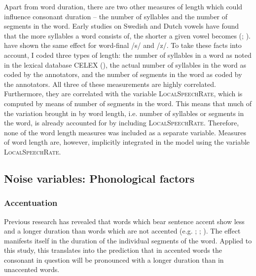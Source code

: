 Apart from word duration, there are two other measures of length which could influence consonant duration --  the number of syllables and the number of segments in the word.  Early studies on Swedish and Dutch vowels have found that the more syllables a word consists of, the shorter a given vowel becomes (\citealt{Lindblom.1963}; \citealt{Nooteboom.1972}). \citet{Plag.2017} have shown the same effect for word-final  /s/ and /z/. To take these facts into account, I coded three types of  length: the number of syllables in a word as noted in the lexical database CELEX (\citealt{Baayen.1995}), the actual number of syllables in the word as coded by the annotators, and the number of segments in the word as coded by the annotators. All three of these measurements are highly correlated. Furthermore, they are correlated with the variable \textsc{LocalSpeechRate}, which is computed by means of number of segments in the word. This means that much of the variation brought in by word length, i.e. number of syllables or segments in the word, is already accounted for by including \textsc{LocalSpeechRate}. Therefore, none of the word length measures was included as a separate variable. Measures of word length are, however, implicitly integrated in the model using the variable \textsc{LocalSpeechRate}.

\subsection{Noise variables: Phonological factors}

\subsubsection{Accentuation} 
Previous research has revealed that words which bear sentence accent show less  and a longer duration than words which are not accented (e.g. \citealt{Sluijter.1996}; \citealt{Sugahara.2009}; \citealt{Bergmann.}). The  effect manifests itself in the duration of the individual segments of the word. Applied to this study, this translates into the prediction that in accented words the consonant in question will be pronounced with a longer duration than in unaccented words. 

